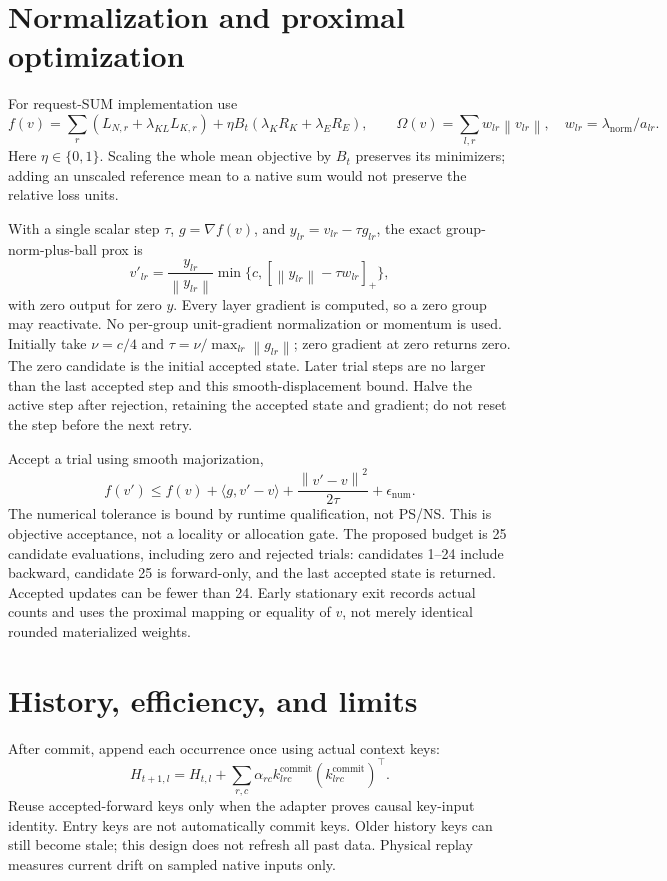 \documentclass[11pt]{article}
\newcommand{\norm}[1]{\left\lVert#1\right\rVert}
\newcommand{\pos}[1]{\left[#1\right]_+}
\begin{document}
\section{Normalization and proximal optimization}
For request-SUM implementation use
\[
f(v)=\sum_r(L_{N,r}+\lambda_{KL}L_{K,r})
+\eta B_t(\lambda_K R_K+\lambda_E R_E),\qquad
\Omega(v)=\sum_{l,r}w_{lr}\norm{v_{lr}},\quad
w_{lr}=\lambda_{\mathrm{norm}}/a_{lr}.
\]
Here $\eta\in\{0,1\}$. Scaling the whole mean objective by $B_t$ preserves
its minimizers; adding an unscaled reference mean to a native sum would
not preserve the relative loss units.

With a single scalar step $\tau$, $g=\nabla f(v)$, and
$y_{lr}=v_{lr}-\tau g_{lr}$, the exact group-norm-plus-ball prox is
\[
v'_{lr}=\frac{y_{lr}}{\norm{y_{lr}}}
\min\{c,\pos{\norm{y_{lr}}-\tau w_{lr}}\},
\]
with zero output for zero $y$. Every layer gradient is computed, so a
zero group may reactivate. No per-group unit-gradient normalization or
momentum is used. Initially take $\nu=c/4$ and
$\tau=\nu/\max_{lr}\norm{g_{lr}}$; zero gradient at zero returns zero.
The zero candidate is the initial accepted state. Later trial steps are
no larger than the last accepted step and this smooth-displacement bound.
Halve the active step after rejection, retaining the accepted state and
gradient; do not reset the step before the next retry.

Accept a trial using smooth majorization,
\[
f(v')\le f(v)+\langle g,v'-v\rangle+
\frac{\norm{v'-v}^2}{2\tau}+\epsilon_{\mathrm{num}}.
\]
The numerical tolerance is bound by runtime qualification, not PS/NS.
This is objective acceptance, not a locality or allocation gate.
The proposed budget is 25 candidate evaluations, including zero and
rejected trials: candidates 1--24 include backward, candidate 25 is
forward-only, and the last accepted state is returned. Accepted updates
can be fewer than 24. Early stationary exit records actual counts and
uses the proximal mapping or equality of $v$, not merely identical
rounded materialized weights.

\section{History, efficiency, and limits}
After commit, append each occurrence once using actual context keys:
\[
H_{t+1,l}=H_{t,l}+\sum_{r,c}\alpha_{rc}
k^{\mathrm{commit}}_{lrc}(k^{\mathrm{commit}}_{lrc})^\top.
\]
Reuse accepted-forward keys only when the adapter proves causal key-input
identity. Entry keys are not automatically commit keys. Older history
keys can still become stale; this design does not refresh all past data.
Physical replay measures current drift on sampled native inputs only.
\end{document}
